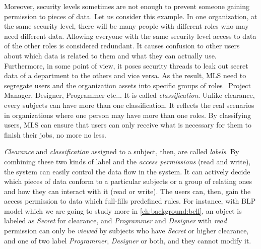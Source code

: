 Moreover, security levels sometimes are not enough to prevent someone gaining permission to pieces of data.
Let us consider this example. 
In one organization, at the same security level, there will be many people with different roles who may need different data.
Allowing everyone with the same security level access to data of the other roles is considered redundant.
It causes confusion to other users about which data is related to them and what they can actually use.
Furthermore, in some point of view, it poses security threads to leak out secret data of a department to the others and vice versa.
As the result, MLS need to segregate users and the organization assets into specific groups of roles \eg\ Project Manager, Designer, Programmer etc...
It is called \emph{classification}.
Unlike clearance, every subjects can have more than one classification.
It reflects the real scenarios in organizations where one person may have more than one roles.
By classifying users, MLS can ensure that users can only receive what is necessary for them to finish their jobs, no more no less.

\emph{Clearance} and \emph{classification} assigned to a subject, then, are called \emph{labels}.
By combining these two kinds of label and the \emph{access permissions} (read and write), the system can easily control the data flow in the system.
It can actively decide which pieces of data conform to a particular subjects or a group of relating ones and how they can interact with it (read or write).
The users can, then, gain the access permission to data which full-fills predefined rules.
For instance, with BLP model which we are going to study more in \autoref{ch:background:bell}, an object is labeled as \emph{Secret} for clearance, and \emph{Programmer} and \emph{Designer} with \emph{read} permission can only be \emph{viewed} by subjects who have \emph{Secret} or higher clearance, and one of two label \emph{Programmer}, \emph{Designer} or both, and they cannot modify it.

